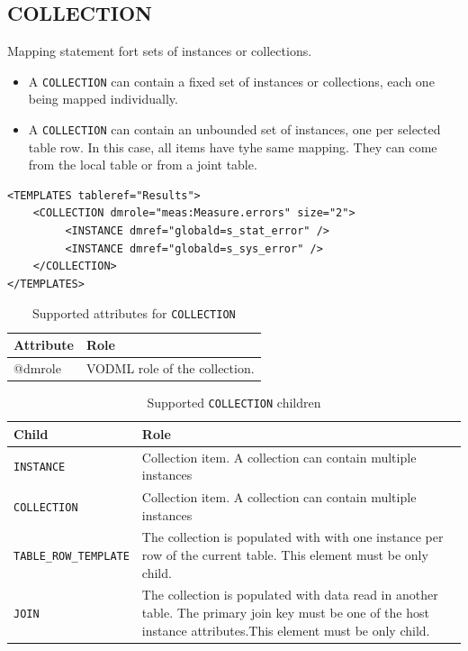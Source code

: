 \documentclass[11pt,a4paper]{ivoa}
\begin{document}
\subsection{COLLECTION}
Mapping statement fort sets of instances or collections.

\begin{itemize}
    \item A \texttt{COLLECTION} can contain a fixed set of instances or collections, each one being mapped individually.  
    \item A \texttt{COLLECTION} can contain an unbounded set of instances, one per selected table row. 
            In this case, all items have tyhe same mapping. They can come from the local table or from a joint table.
 \end{itemize}


\begin{lstlisting}[caption={COLLECTION example},captionpos=b]
<TEMPLATES tableref="Results">
    <COLLECTION dmrole="meas:Measure.errors" size="2">
         <INSTANCE dmref="globald=s_stat_error" />         
         <INSTANCE dmref="globald=s_sys_error" />
    </COLLECTION>
</TEMPLATES>
\end{lstlisting}

\begin{table}[!htbp]
     \begin{tabular}{|p{1.5cm}|p{10.5cm}|}
       \hline Attribute & Role\\
       \hline  
      @dmrole    & VODML role of the collection.\\       
       \hline 
     \end{tabular}
     \caption{Supported attributes for  \texttt{COLLECTION}} 
     \label{tbl:att-att}
 \end{table}

\begin{table}[!htbp]
     \begin{tabular}{|p{4cm}|p{9cm}|}
       \hline Child &  Role\\
       \hline  \texttt{INSTANCE}    & Collection item. A collection can contain multiple instances \\              
       \hline  \texttt{COLLECTION}    & Collection item. A collection can contain multiple instances \\       
       \hline  \texttt{TABLE\_ROW\_TEMPLATE}    & The collection is populated with with one instance per row of the current table. This element must be only child. \\       
       \hline  \texttt{JOIN}    & The collection is populated with data read in another table. The primary join key must be one of the host instance attributes.This element must be only child. \\      
       \hline 
     \end{tabular}
     \caption{Supported  \texttt{COLLECTION} children} 
     \label{tbl:coll-children}
\end{table}
\end{document}
